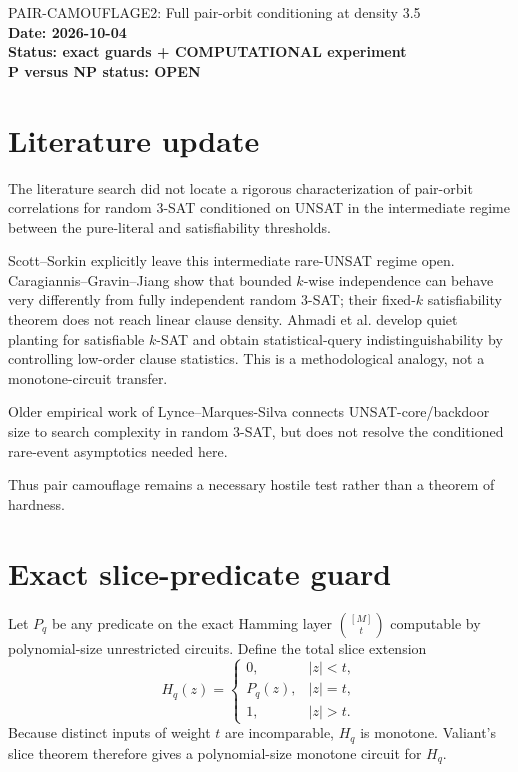 \documentclass[11pt]{article}
\begin{document}
\begin{center}
{\Large PAIR-CAMOUFLAGE2: Full pair-orbit conditioning at density 3.5}\\[4pt]
\textbf{Date: 2026-10-04}\\
\textbf{Status: exact guards + COMPUTATIONAL experiment}\\
\textbf{P versus NP status: OPEN}
\end{center}

\section{Literature update}

The literature search did not locate a rigorous characterization of pair-orbit
correlations for random 3-SAT conditioned on UNSAT in the intermediate regime
between the pure-literal and satisfiability thresholds.

Scott--Sorkin explicitly leave this intermediate rare-UNSAT regime open.
Caragiannis--Gravin--Jiang show that bounded $k$-wise independence can behave
very differently from fully independent random 3-SAT; their fixed-$k$
satisfiability theorem does not reach linear clause density.  Ahmadi et al.
develop quiet planting for satisfiable $k$-SAT and obtain statistical-query
indistinguishability by controlling low-order clause statistics.  This is a
methodological analogy, not a monotone-circuit transfer.

Older empirical work of Lynce--Marques-Silva connects UNSAT-core/backdoor size
to search complexity in random 3-SAT, but does not resolve the conditioned
rare-event asymptotics needed here.

Thus pair camouflage remains a necessary hostile test rather than a theorem
of hardness.

\section{Exact slice-predicate guard}

Let $P_q$ be any predicate on the exact Hamming layer
$\binom{[M]}t$ computable by polynomial-size unrestricted circuits.  Define
the total slice extension
\[
H_q(z)=
\begin{cases}
0,&|z|<t,\\
P_q(z),&|z|=t,\\
1,&|z|>t.
\end{cases}
\]
Because distinct inputs of weight $t$ are incomparable, $H_q$ is monotone.
Valiant's slice theorem therefore gives a polynomial-size monotone circuit for
$H_q$.
\end{document}
